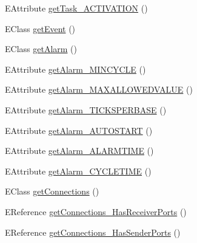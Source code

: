 \begin{DoxyCompactItemize}
\item 
E\-Attribute \hyperlink{interfaceshootingmachineemfmodel_1_1_shootingmachineemfmodel_package_a6cb0ef9358d304cc90461234ff700cac}{get\-Task\-\_\-\-A\-C\-T\-I\-V\-A\-T\-I\-O\-N} ()
\item 
E\-Class \hyperlink{interfaceshootingmachineemfmodel_1_1_shootingmachineemfmodel_package_ac3f35390c2f26e726c768a56d379052c}{get\-Event} ()
\item 
E\-Class \hyperlink{interfaceshootingmachineemfmodel_1_1_shootingmachineemfmodel_package_a83b49bdf97b3b7cd20f8051e755a3b17}{get\-Alarm} ()
\item 
E\-Attribute \hyperlink{interfaceshootingmachineemfmodel_1_1_shootingmachineemfmodel_package_adfdf8bd090aad036db076b0c4a3017cb}{get\-Alarm\-\_\-\-M\-I\-N\-C\-Y\-C\-L\-E} ()
\item 
E\-Attribute \hyperlink{interfaceshootingmachineemfmodel_1_1_shootingmachineemfmodel_package_aebf4ea9144f4cdf31d621ce7e578ad8a}{get\-Alarm\-\_\-\-M\-A\-X\-A\-L\-L\-O\-W\-E\-D\-V\-A\-L\-U\-E} ()
\item 
E\-Attribute \hyperlink{interfaceshootingmachineemfmodel_1_1_shootingmachineemfmodel_package_ae7600c8ca0a9195d693d94e1656368fa}{get\-Alarm\-\_\-\-T\-I\-C\-K\-S\-P\-E\-R\-B\-A\-S\-E} ()
\item 
E\-Attribute \hyperlink{interfaceshootingmachineemfmodel_1_1_shootingmachineemfmodel_package_a50821a52c50a7534425ec4c80717ec71}{get\-Alarm\-\_\-\-A\-U\-T\-O\-S\-T\-A\-R\-T} ()
\item 
E\-Attribute \hyperlink{interfaceshootingmachineemfmodel_1_1_shootingmachineemfmodel_package_aacc99d1def2a953675902eeb695c03ec}{get\-Alarm\-\_\-\-A\-L\-A\-R\-M\-T\-I\-M\-E} ()
\item 
E\-Attribute \hyperlink{interfaceshootingmachineemfmodel_1_1_shootingmachineemfmodel_package_a48f85faac1af8eb7d92ee3053c00ce0c}{get\-Alarm\-\_\-\-C\-Y\-C\-L\-E\-T\-I\-M\-E} ()
\item 
E\-Class \hyperlink{interfaceshootingmachineemfmodel_1_1_shootingmachineemfmodel_package_adcfb239daa13075d25d4b55b1c5bdda2}{get\-Connections} ()
\item 
E\-Reference \hyperlink{interfaceshootingmachineemfmodel_1_1_shootingmachineemfmodel_package_a940cd2471e8ba55f32a6c4a6bafc7c9c}{get\-Connections\-\_\-\-Has\-Receiver\-Ports} ()
\item 
E\-Reference \hyperlink{interfaceshootingmachineemfmodel_1_1_shootingmachineemfmodel_package_ab245415cfc1d1656deee570eb4d4b8c1}{get\-Connections\-\_\-\-Has\-Sender\-Ports} ()
\item 

\end{DoxyCompactItemize}
